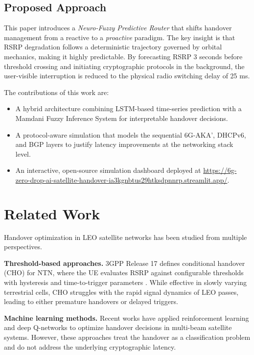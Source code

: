 \documentclass[conference]{IEEEtran}
\begin{document}
\subsection{Proposed Approach}

This paper introduces a \textit{Neuro-Fuzzy Predictive Router} that shifts handover management from a reactive to a \textit{proactive} paradigm. The key insight is that RSRP degradation follows a deterministic trajectory governed by orbital mechanics, making it highly predictable. By forecasting RSRP 3 seconds before threshold crossing and initiating cryptographic protocols in the background, the user-visible interruption is reduced to the physical radio switching delay of 25 ms.

The contributions of this work are:
\begin{itemize}
    \item A hybrid architecture combining LSTM-based time-series prediction with a Mamdani Fuzzy Inference System for interpretable handover decisions.
    \item A protocol-aware simulation that models the sequential 6G-AKA', DHCPv6, and BGP layers to justify latency improvements at the networking stack level.
    \item An interactive, open-source simulation dashboard deployed at \url{https://6g-zero-drop-ai-satellite-handover-ia3kgnbtus29htksdpnnrp.streamlit.app/}.
\end{itemize}

\section{Related Work}

Handover optimization in LEO satellite networks has been studied from multiple perspectives.

\textbf{Threshold-based approaches.} 3GPP Release 17 defines conditional handover (CHO) for NTN, where the UE evaluates RSRP against configurable thresholds with hysteresis and time-to-trigger parameters \cite{b3}. While effective in slowly varying terrestrial cells, CHO struggles with the rapid signal dynamics of LEO passes, leading to either premature handovers or delayed triggers.

\textbf{Machine learning methods.} Recent works have applied reinforcement learning \cite{b4} and deep Q-networks \cite{b5} to optimize handover decisions in multi-beam satellite systems. However, these approaches treat the handover as a classification problem and do not address the underlying cryptographic latency.
\end{document}
